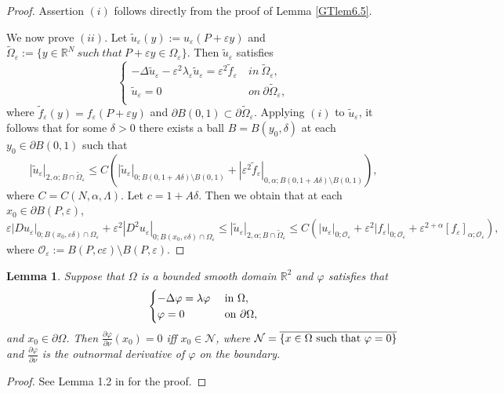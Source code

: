 \documentclass[11pt,reqno]{article}
\newtheorem{lemma}[teo]{Lemma}
\numberwithin{equation}{section}
\newcommand\R{\mathbb R}
\newcommand\e\varepsilon
\renewcommand\O\Omega
\begin{document}
\begin{proof}
Assertion $(i)$ follows directly from the proof of Lemma \ref{GTlem6.5}.

We now prove $(ii)$.
    Let $\tilde{u}_\e(y):=u_\e(P+\e y)$ and $\tilde{\O}_\e:=\{y\in \R^N \ such \ that \ P+\e y\in \O_\e\}$. Then  $\tilde {u}_\e$ satisfies 
    $$
    \begin{cases}
    -\Delta \tilde{u}_\e-\e^2\lambda_\e\tilde{u}_\e=\e^2\tilde{f}_\e\ &in\ \tilde{\O}_\e,\\
     \tilde{u}_\e=0&on \ \partial \tilde{\O}_\e,\\
     \end{cases}
    $$
    where $\tilde{f}_\e(y)=f_\e(P+\e y)$ and $\partial B(0,1)\subset \partial \tilde{\O}_\e $. Applying $(i)$ to  $\tilde{u}_\e$, it follows that for some $\delta>0$  there exists a ball $B=B(y_0,\delta)$  at each $y_0\in \partial B(0,1)$ such that 
    \begin{equation*}
       |\tilde{u}_\e|_{2,\alpha;B\cap \tilde{\O}_\e} \leq C(|\tilde{u}_\e|_{0;B(0,1+A\delta)\setminus B(0,1)}+|\e^2\tilde{f}_\e|_{0,\alpha;B(0,1+A\delta)\setminus B(0,1)}),
    \end{equation*}
    where $C=C(N,\alpha,\Lambda)$.
  Let $c=1+A\delta$.  Then we obtain that at each $x_0\in \partial B(P,\e)$,
    \begin{equation*}
       \e|Du_\e|_{0;B(x_0,\e\delta)\cap \O_\e }+\e^2|D^2u_\e|_{0;B(x_0,\e\delta)\cap \O_\e }\leq  |\tilde{u}_\e|_{2,\alpha;B\cap \tilde{\O}_\e} \leq C(|u_\e|_{0;\mathcal{O}_\e}+\e^2|f_\e|_{0;\mathcal{O}_\e}+\e^{2+\alpha}[f_\e]_{\alpha;\mathcal{O}_\e}),
    \end{equation*}
    where $\mathcal{O}_\e:=B(P,c\e)\setminus B(P,\e)$.
\end{proof}

 \begin{lemma}\label{LCS}
     Suppose that $\O$ is a bounded smooth domain $\R^2$ and $\varphi$ satisfies that
     \begin{equation*}
         \begin{cases}
             -\Delta \varphi =\lambda\varphi\ & \hbox{in } \O,\\
             \varphi=0 \ &\hbox{on } \partial \O,\\
         \end{cases}
     \end{equation*}
     and $x_0\in \partial\O$. Then $\frac{\partial\varphi}{\partial\nu}(x_0)=0$ iff $x_0\in \mathcal{N}$, where $\mathcal{N}=\overline{\{x\in\O\hbox{ such that }\varphi=0\}}$ and $\frac{\partial\varphi}{\partial\nu}$ is the outnormal derivative of $\varphi$ on the boundary.
 \end{lemma}
\begin{proof}
  See  Lemma 1.2 in \cite{CSLin1987} for the proof.
  \end{proof}
\end{document}
